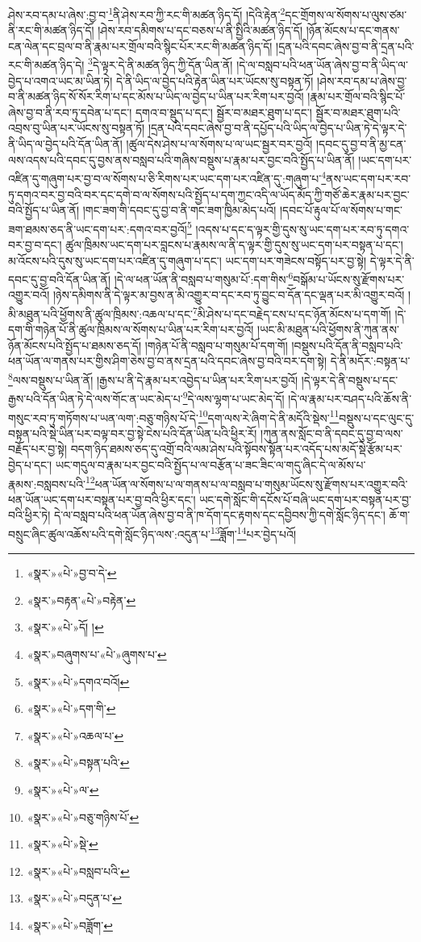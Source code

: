 ཤེས་རབ་དམ་པ་ཞེས་:བྱ་བ་\footnote{«སྣར་»«པེ་»བྱ་བ་དེ་}ནི་ཤེས་རབ་ཀྱི་རང་གི་མཚན་ཉིད་དོ། །དེའི་རྟེན་\footnote{«སྣར་»བརྟན་«པེ་»བརྟེན་}དང་གྲོགས་ལ་སོགས་པ་ལུས་ཙམ་ནི་རང་གི་མཚན་ཉིད་དོ། །ཤེས་རབ་དམིགས་པ་དང་བཅས་པ་ནི་སྤྱིའི་མཚན་ཉིད་དོ། །ཉོན་མོངས་པ་དང་གནས་ངན་ལེན་དང་བྲལ་བ་ནི་རྣམ་པར་གྲོལ་བའི་སྙིང་པོར་རང་གི་མཚན་ཉིད་དོ། །དྲན་པའི་དབང་ཞེས་བྱ་བ་ནི་དྲན་པའི་རང་གི་མཚན་ཉིད་དེ། \footnote{«སྣར་»«པེ་»དོ། ། }དེ་ལྟར་དེ་ནི་མཚན་ཉིད་ཀྱི་དོན་ཡིན་ནོ། །དེ་ལ་བསླབ་པའི་ཕན་ཡོན་ཞེས་བྱ་བ་ནི་ཡིད་ལ་བྱེད་པ་འགའ་ཡང་མ་ཡིན་ཏེ། དེ་ནི་ཡིད་ལ་བྱེད་པའི་རྟེན་ཡིན་པར་ཡོངས་སུ་བསྟན་ཏོ། །ཤེས་རབ་དམ་པ་ཞེས་བྱ་བ་ནི་མཚན་ཉིད་སོ་སོར་རིག་པ་དང་མོས་པ་ཡིད་ལ་བྱེད་པ་ཡིན་པར་རིག་པར་བྱའོ། །རྣམ་པར་གྲོལ་བའི་སྙིང་པོ་ཞེས་བྱ་བ་ནི་རབ་ཏུ་དབེན་པ་དང་། དགའ་བ་སྡུད་པ་དང་། སྦྱོར་བ་མཐར་ཐུག་པ་དང་། སྦྱོར་བ་མཐར་ཐུག་པའི་འབྲས་བུ་ཡིན་པར་ཡོངས་སུ་བསྟན་ཏོ། །དྲན་པའི་དབང་ཞེས་བྱ་བ་ནི་དཔྱོད་པའི་ཡིད་ལ་བྱེད་པ་ཡིན་ཏེ་དེ་ལྟར་དེ་ནི་ཡིད་ལ་བྱེད་པའི་དོན་ཡིན་ནོ། །ཚུལ་དེས་ཤེས་པ་ལ་སོགས་པ་ལ་ཡང་སྦྱར་བར་བྱའོ། །དབང་དུ་བྱ་བ་ནི་མྱ་ངན་ལས་འདས་པའི་དབང་དུ་བྱས་ནས་བསླབ་པའི་གཞིས་བསྡུས་པ་རྣམ་པར་བྱང་བའི་སྤྱོད་པ་ཡིན་ནོ། །ཡང་དག་པར་འཛིན་དུ་གཞུག་པར་བྱ་བ་ལ་སོགས་པ་ཅི་རིགས་པར་ཡང་དག་པར་འཛིན་དུ་:གཞུག་པ་\footnote{«སྣར་»བཞུགས་པ་«པེ་»ཞུགས་པ་}ནས་ཡང་དག་པར་རབ་ཏུ་དགའ་བར་བྱ་བའི་བར་དང་དགེ་བ་ལ་སོགས་པའི་སྤྱོད་པ་དག་ཀྱང་འདི་ལ་ཡོད་མོད་ཀྱི་གཙོ་ཆེར་རྣམ་པར་བྱང་བའི་སྤྱོད་པ་ཡིན་ནོ། །གང་ཟག་གི་དབང་དུ་བྱ་བ་ནི་གང་ཟག་ཁྱིམ་མེད་པའོ། །དབང་པོ་རྟུལ་པོ་ལ་སོགས་པ་གང་ཟག་ཐམས་ཅད་ནི་ཡང་དག་པར་:དགའ་བར་བྱའོ།\footnote{«སྣར་»«པེ་»དགའ་བའོ།} །འདས་པ་དང་ད་ལྟར་གྱི་དུས་སུ་ཡང་དག་པར་རབ་ཏུ་དགའ་བར་བྱ་བ་དང་། ཚུལ་ཁྲིམས་ཡང་དག་པར་བླངས་པ་རྣམས་ལ་ནི་ད་ལྟར་གྱི་དུས་སུ་ཡང་དག་པར་བསྟན་པ་དང་། མ་འོངས་པའི་དུས་སུ་ཡང་དག་པར་འཛིན་དུ་གཞུག་པ་དང་། ཡང་དག་པར་གཟེངས་བསྟོད་པར་བྱ་སྟེ། དེ་ལྟར་དེ་ནི་དབང་དུ་བྱ་བའི་དོན་ཡིན་ནོ། །དེ་ལ་ཕན་ཡོན་ནི་བསླབ་པ་གསུམ་པོ་:དག་གིས་\footnote{«སྣར་»«པེ་»དག་གི་}བསྒོམ་པ་ཡོངས་སུ་རྫོགས་པར་འགྱུར་བའོ། །ཉེས་དམིགས་ནི་དེ་ལྟར་མ་བྱས་ན་མི་འགྱུར་བ་དང་རབ་ཏུ་བྱུང་བ་དོན་དང་ལྡན་པར་མི་འགྱུར་བའོ། །མི་མཐུན་པའི་ཕྱོགས་ནི་ཚུལ་ཁྲིམས་:འཆལ་པ་དང་\footnote{«སྣར་»«པེ་»འཆལ་པ་}མི་ཤེས་པ་དང་བརྗེད་ངས་པ་དང་ཉོན་མོངས་པ་དག་གོ། །དེ་དག་གི་གཉེན་པོ་ནི་ཚུལ་ཁྲིམས་ལ་སོགས་པ་ཡིན་པར་རིག་པར་བྱའོ། །ཡང་མི་མཐུན་པའི་ཕྱོགས་ནི་ཀུན་ནས་ཉོན་མོངས་པའི་སྤྱོད་པ་ཐམས་ཅད་དོ། །གཉེན་པོ་ནི་བསླབ་པ་གསུམ་པོ་དག་གོ། །བསྡུས་པའི་དོན་ནི་བསླབ་པའི་ཕན་ཡོན་ལ་གནས་པར་གྱིས་ཤིག་ཅེས་བྱ་བ་ནས་དྲན་པའི་དབང་ཞེས་བྱ་བའི་བར་དག་སྟེ། དེ་ནི་མདོར་:བསྟན་པ་\footnote{«སྣར་»«པེ་»བསྟན་པའི་}ལས་བསྡུས་པ་ཡིན་ནོ། །རྒྱས་པ་ནི་དེ་རྣམ་པར་འབྱེད་པ་ཡིན་པར་རིག་པར་བྱའོ། །དེ་ལྟར་དེ་ནི་བསྡུས་པ་དང་རྒྱས་པའི་དོན་ཡིན་ཏེ་དེ་ལས་གོང་ན་ཡང་མེད་པ་\footnote{«སྣར་»«པེ་»ལ་}དེ་ལས་ལྷག་པ་ཡང་མེད་དོ། །དེ་ལ་རྣམ་པར་བཤད་པའི་ཆོས་ནི་གསུང་རབ་ཏུ་གཏོགས་པ་ཡན་ལག་:བཅུ་གཉིས་པོ་དེ་\footnote{«སྣར་»«པེ་»བཅུ་གཉིས་པོ་}དག་ལས་རེ་ཞིག་དེ་ནི་མདོའི་སྡེས་\footnote{«སྣར་»«པེ་»སྡེ་}བསྡུས་པ་དང་ལུང་དུ་བསྟན་པའི་སྡེ་ཡིན་པར་བལྟ་བར་བྱ་སྟེ་ངེས་པའི་དོན་ཡིན་པའི་ཕྱིར་རོ། །ཀུན་ནས་སློང་བ་ནི་དབང་དུ་བྱ་བ་ལས་བརྗོད་པར་བྱ་སྟེ། བདག་ཉིད་ཐམས་ཅད་དུ་འགྲོ་བའི་ལམ་ཤེས་པའི་སྟོབས་སྟོན་པར་འདོད་པས་མདོ་སྡེ་རྩོམ་པར་བྱེད་པ་དང་། ཡང་གདུལ་བ་རྣམ་པར་བྱང་བའི་སྤྱོད་པ་ལ་བརྩོན་པ་ཟང་ཟིང་ལ་གདུ་ཞིང་དེ་ལ་མོས་པ་རྣམས་:བསླབས་པའི་\footnote{«སྣར་»«པེ་»བསླབ་པའི་}ཕན་ཡོན་ལ་སོགས་པ་ལ་གནས་པ་ལ་བསླབ་པ་གསུམ་ཡོངས་སུ་རྫོགས་པར་འགྱུར་བའི་ཕན་ཡོན་ཡང་དག་པར་བསྟན་པར་བྱ་བའི་ཕྱིར་དང་། ཡང་དགེ་སློང་གི་དངོས་པོ་བཞི་ཡང་དག་པར་བསྟན་པར་བྱ་བའི་ཕྱིར་ཏེ། དེ་ལ་བསླབ་པའི་ཕན་ཡོན་ཞེས་བྱ་བ་ནི་ཁ་དོག་དང་རྟགས་དང་དབྱིབས་ཀྱི་དགེ་སློང་ཉིད་དང་། ཆོ་ག་བསྲུང་ཞིང་ཚུལ་འཆོས་པའི་དགེ་སློང་ཉིད་ལས་:འདུན་པ་\footnote{«སྣར་»«པེ་»བདུན་པ་}ཟློག་\footnote{«སྣར་»«པེ་»བཟློག་}པར་བྱེད་པའོ། 